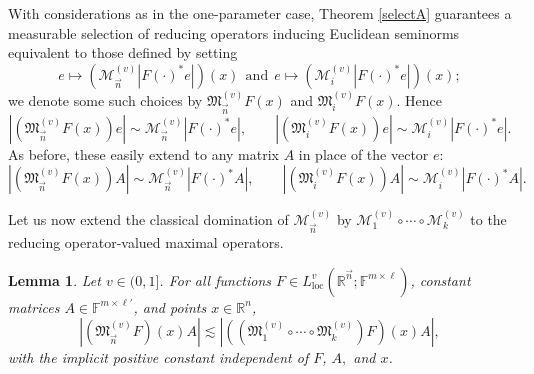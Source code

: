 \documentclass[11pt, reqno]{amsart}
\newtheorem{lemma}[theorem]{Lemma}
\theoremstyle{definition}
\theoremstyle{remark}
\numberwithin{equation}{section}
\newcommand{\F}{\mathbb F}
\newcommand{\M}{\mathfrak M}
\newcommand{\R}{\mathbb R}
\newcommand{\vn}{\vec n}
\newcommand{\loc}{\mathrm{loc}}
\newcommand{\abs}[1]{|#1|}
\begin{document}
With considerations as in the one-parameter case, Theorem \ref{selectA} guarantees a measurable selection of reducing operators inducing Euclidean seminorms equivalent to those defined by setting
$$
e\mapsto (\mathcal M^{(v)}_{\vn}\abs{F(\cdot)^*e})(x)
\ \ \text{and}\ \
e\mapsto (\mathcal M^{(v)}_i\abs{F(\cdot)^*e})(x);
$$
we denote some such choices by $\M^{(v)}_{\vn}F(x)$ and $\M^{(v)}_i F(x)$. Hence
\begin{equation*}
\abs{(\M^{(v)}_{\vn}F(x))e}\sim \mathcal M^{(v)}_{\vn}|F(\cdot)^*e|,\qquad
\abs{(\M^{(v)}_iF(x))e}\sim \mathcal M^{(v)}_i|F(\cdot)^*e|.
\end{equation*}
As before, these easily extend to any matrix $A$ in place of the vector $e$:
\begin{equation}\label{MnA}
\abs{(\M^{(v)}_{\vn}F(x))A}\sim \mathcal M^{(v)}_{\vn}|F(\cdot)^*A|,\qquad
\abs{(\M^{(v)}_iF(x))A}\sim \mathcal M^{(v)}_i|F(\cdot)^*A|.
\end{equation}

Let us now extend the classical domination of $\mathcal M_{\vn}^{(v)}$ by $\mathcal M_1^{(v)}\circ\cdots\circ \mathcal M_k^{(v)}$ to the reducing operator-valued maximal operators.

\begin{lemma}\label{MA bd}
Let $v\in(0,1]$. For all functions $F\in L^v_{\loc}(\R^{\vn};\F^{m\times\ell})$, constant matrices $A\in\F^{m\times\ell'}$, and points $x\in\R^n$,
\begin{equation*}
\abs{(\M_{\vn}^{(v)}F)(x)A}
\lesssim\abs{((\M_1^{(v)}\circ\cdots\circ \M_k^{(v)})F)(x)A},
\end{equation*}
with the implicit positive constant independent of $F$, $A,$ and $x$.
\end{lemma}
\end{document}
